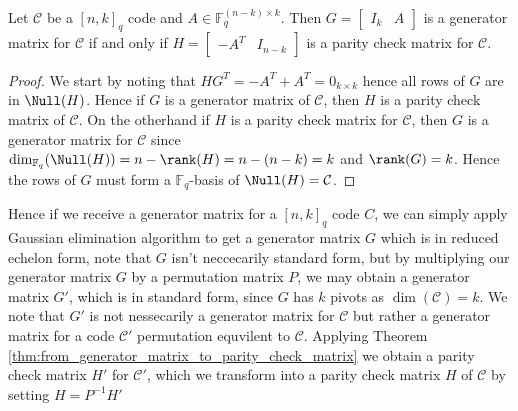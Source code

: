 \begin{theorem}\label{thm:from_generator_matrix_to_parity_check_matrix}
  Let $\mathcal{C}$ be a $[n, k]_q$ code and $A \in \mathbb{F}_q^{(n - k) \times k}$. Then $G = \begin{bmatrix} I_k & A \end{bmatrix}$ is a generator matrix for $\mathcal{C}$ if and only if $H = \begin{bmatrix}-A^T & I_{n - k}\end{bmatrix}$ is a parity check matrix for $\mathcal{C}$.
\end{theorem}
\begin{proof}
  We start by noting that $HG^T = -A^T + A^T = 0_{k \times k}$ hence all rows of $G$ are in $\Null(H)$. Hence if $G$ is a generator matrix of $\mathcal{C}$, then $H$ is a parity check matrix of $\mathcal{C}$. On the otherhand if $H$ is a parity check matrix for $\mathcal{C}$, then $G$ is a generator matrix for $\mathcal{C}$ since $\dim_{\mathbb{F}_q}(\Null(H)) = n - \rank(H) = n - (n - k) = k$ and $\rank(G) = k$. Hence the rows of $G$ must form a $\mathbb{F}_q$-basis of $\Null(H) = \mathcal{C}$.
\end{proof}

Hence if we receive a generator matrix for a $[n, k]_q$ code $C$, we can simply apply Gaussian elimination algorithm to get a generator matrix $G$ which is in reduced echelon form, note that $G$ isn't neccecarily standard form, but by multiplying our generator matrix $G$ by a permutation matrix $P$, we may obtain a generator matrix $G'$, which is in standard form, since $G$ has $k$ pivots as $\dim(\mathcal{C}) = k$. We note that $G'$ is not nessecarily a generator matrix for $\mathcal{C}$ but rather a generator matrix for a code $\mathcal{C}'$ permutation equvilent to $\mathcal{C}$. Applying Theorem \ref{thm:from_generator_matrix_to_parity_check_matrix} we obtain a parity check matrix $H'$ for $\mathcal{C}'$, which we transform into a parity check matrix $H$ of $\mathcal{C}$ by setting $H = P^{-1}H'$

